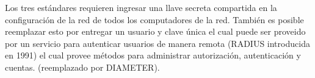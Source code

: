Los tres estándares requieren ingresar una llave secreta compartida en la configuración de la red de todos los computadores de la red. También es posible reemplazar esto por entregar un usuario y clave única el cual puede ser proveido por un servicio para autenticar usuarios de manera remota (RADIUS introducida en 1991) el cual provee métodos para administrar autorización, autenticación y cuentas. (reemplazado por DIAMETER).